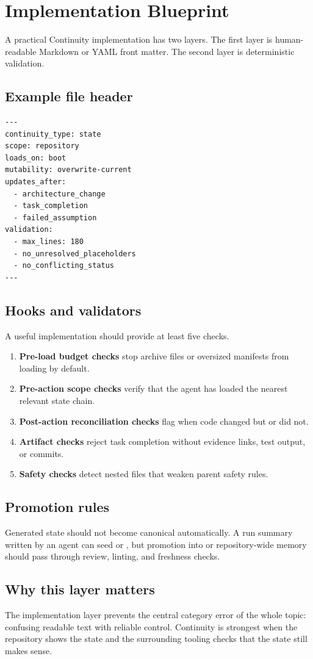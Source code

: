 
\section{Implementation Blueprint}



A practical Continuity implementation has two layers. The first layer is human-readable Markdown or YAML front matter. The second layer is deterministic validation.

\subsection{Example file header}

\begin{lstlisting}
---
continuity_type: state
scope: repository
loads_on: boot
mutability: overwrite-current
updates_after:
  - architecture_change
  - task_completion
  - failed_assumption
validation:
  - max_lines: 180
  - no_unresolved_placeholders
  - no_conflicting_status
---
\end{lstlisting}

\subsection{Hooks and validators}

A useful implementation should provide at least five checks.
\begin{enumerate}
  \item \textbf{Pre-load budget checks} stop archive files or oversized manifests from loading by default.
  \item \textbf{Pre-action scope checks} verify that the agent has loaded the nearest relevant state chain.
  \item \textbf{Post-action reconciliation checks} flag when code changed but  or  did not.
  \item \textbf{Artifact checks} reject task completion without evidence links, test output, or commits.
  \item \textbf{Safety checks} detect nested files that weaken parent safety rules.
\end{enumerate}

\subsection{Promotion rules}

Generated state should not become canonical automatically. A run summary written by an agent can seed  or , but promotion into  or repository-wide memory should pass through review, linting, and freshness checks.

\subsection{Why this layer matters}

The implementation layer prevents the central category error of the whole topic: confusing readable text with reliable control. Continuity is strongest when the repository shows the state and the surrounding tooling checks that the state still makes sense.
